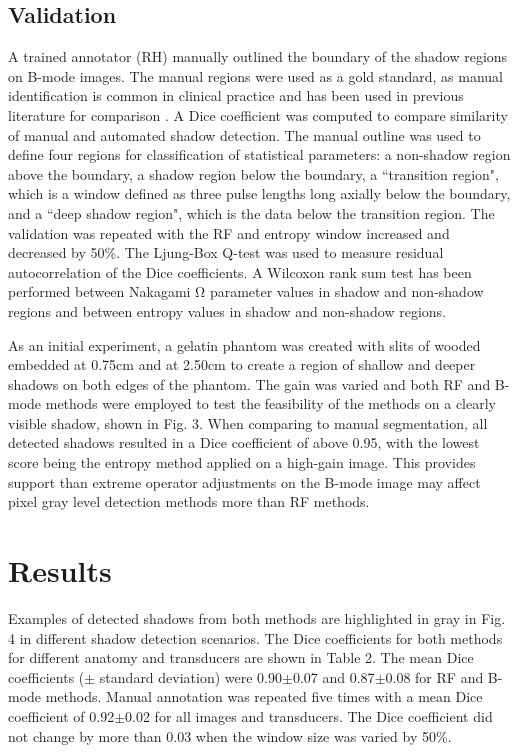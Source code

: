 \documentclass[authoryear,preprint,review,12pt]{elsarticle}
\begin{document}
\subsection*{Validation}

A trained annotator (RH) manually outlined the boundary of the shadow regions on B-mode images. The manual regions were used as a gold standard, as manual identification is common in clinical practice and has been used in previous literature for comparison \citep{Hellier2010}. A Dice coefficient was computed to compare similarity of manual and automated shadow detection. The manual outline was used to define four regions for classification of statistical parameters: a non-shadow region above the boundary, a shadow region below the boundary, a ``transition region", which is a window defined as three pulse lengths long axially below the boundary, and a ``deep shadow region", which is the data below the transition region. The validation was repeated with the RF and entropy window increased and decreased by 50\%. The Ljung-Box Q-test was used to measure residual autocorrelation of the Dice coefficients. A Wilcoxon rank sum test has been performed between Nakagami Ω parameter values in shadow and non-shadow regions and between entropy values in shadow and non-shadow regions.

As an initial experiment, a gelatin phantom was created with slits of wooded embedded at 0.75cm and at 2.50cm to create a region of shallow and deeper shadows on both edges of the phantom. The gain was varied and both RF and B-mode methods were employed to test the feasibility of the methods on a clearly visible shadow, shown in Fig. 3. When comparing to manual segmentation, all detected shadows resulted in a Dice coefficient of above 0.95, with the lowest score being the entropy method applied on a high-gain image. This provides support than extreme operator adjustments on the B-mode image may affect pixel gray level detection methods more than RF methods.
%
\section*{Results}
\label{Results}
Examples of detected shadows from both methods are highlighted in gray in Fig. 4 in different shadow detection scenarios. The Dice coefficients for both methods for different anatomy and transducers are shown in Table 2. The mean Dice coefficients ($\pm$ standard deviation) were 0.90$\pm$0.07 and 0.87$\pm$0.08 for RF and B-mode methods. Manual annotation was repeated five times with a mean Dice coefficient of 0.92$\pm$0.02 for all images and transducers. The Dice coefficient did not change by more than 0.03 when the window size was varied by 50\%.
\end{document}
